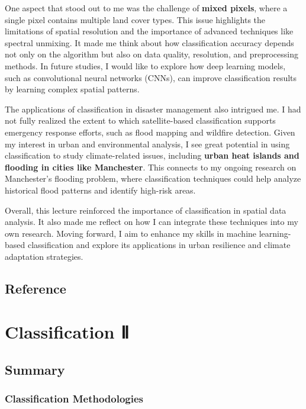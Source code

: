 \documentclass[
  letterpaper,
]{scrbook}
\begin{document}
One aspect that stood out to me was the challenge of \textbf{mixed
pixels}, where a single pixel contains multiple land cover types. This
issue highlights the limitations of spatial resolution and the
importance of advanced techniques like spectral unmixing. It made me
think about how classification accuracy depends not only on the
algorithm but also on data quality, resolution, and preprocessing
methods. In future studies, I would like to explore how deep learning
models, such as convolutional neural networks (CNNs), can improve
classification results by learning complex spatial patterns.

The applications of classification in disaster management also intrigued
me. I had not fully realized the extent to which satellite-based
classification supports emergency response efforts, such as flood
mapping and wildfire detection. Given my interest in urban and
environmental analysis, I see great potential in using classification to
study climate-related issues, including \textbf{urban heat islands and
flooding in cities like Manchester}. This connects to my ongoing
research on Manchester's flooding problem, where classification
techniques could help analyze historical flood patterns and identify
high-risk areas.

Overall, this lecture reinforced the importance of classification in
spatial data analysis. It also made me reflect on how I can integrate
these techniques into my own research. Moving forward, I aim to enhance
my skills in machine learning-based classification and explore its
applications in urban resilience and climate adaptation strategies.

\section{Reference}\label{reference-4}


\chapter{Classification Ⅱ}\label{classification-ux2171}

\section{Summary}\label{summary-4}

\subsection{Classification
Methodologies}\label{classification-methodologies}
\end{document}
